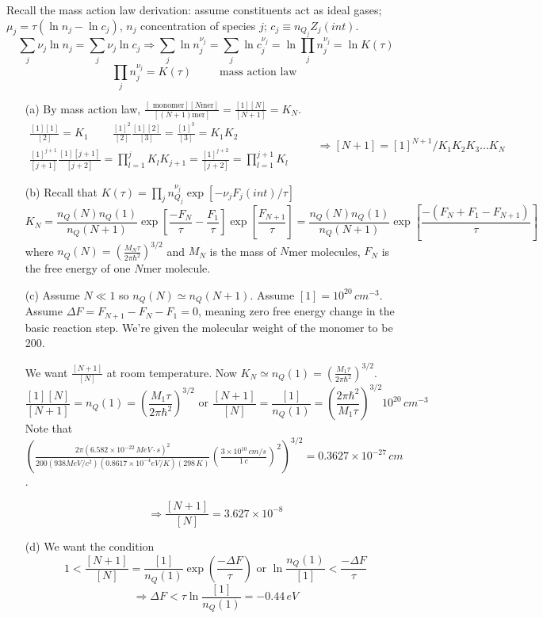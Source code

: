 \documentclass[twoside]{amsart}
\theoremstyle{plain}
\theoremstyle{definition}
\begin{document}
Recall the mass action law derivation: assume constituents act as ideal gases; $\mu_j  = \tau(\ln{n_j} - \ln{c_j})$, $n_j$ concentration of species $j$; $c_j \equiv n_{Q_j} Z_j(int)$.  
\[
\sum_j \nu_j\ln{n_j} = \sum_j \nu_j \ln{c_j} \Longrightarrow \sum_j \ln{n_j^{\nu_j}} = \sum_j \ln{c_j^{\nu_j}} = \ln{ \prod_j n_j^{\nu_j} } = \ln{ K(\tau) }
\]
\[
\prod_j n_j^{\nu_j} = K(\tau) \quad \quad \, \text{ mass action law }
\]
\hrulefill

\begin{itemize}
\item[(a)] By mass action law, $\frac{ [\text{ monomer}][N\text{mer}] }{[(N+1)\text{mer}]} = \frac{ [1][N]}{[N+1]} = K_N$.  
\[
\begin{gathered}
  \frac{[1][1]}{[2]} = K_1 \quad \quad \, \frac{ [1]^2}{[2]}\frac{[1][2]}{[3]} = \frac{[1]^3}{[3]} = K_1 K_2 \\ 
  \frac{ [1]^{j+1} }{[j+1]} \frac{ [1][j+1] }{[j+2]} = \prod^j_{l=1} K_l K_{j+1} = \frac{[1]^{j+2}}{[j+2]} = \prod_{l=1}^{j+1} K_l 
\end{gathered} \quad \quad \, \Longrightarrow \boxed{ [N+1]= [1]^{N+1}/K_1 K_2 K_3 \dots K_N }
\]
\item[(b)] Recall that $K(\tau) = \prod_j n_{Q_j}^{\nu_j} \exp{ [ - \nu_j F_j(int)/\tau ]}$  
\[
K_N = \frac{n_Q(N)n_Q(1)}{ n_Q(N+1)} \exp{ \left[ \frac{-F_N}{\tau} - \frac{F_1}{\tau} \right] }\exp{ \left[ \frac{ F_{N+1}}{\tau} \right] } = \frac{ n_Q(N)n_Q(1) }{n_Q(N+1)} \exp{ \left[ \frac{ - (F_N + F_1 - F_{N+1} )}{\tau} \right]}
\]
where $n_Q(N) = \left( \frac{M_N \tau}{2\pi \hbar^2} \right)^{3/2}$ and $M_N$ is the mass of $N$mer molecules, $F_N$ is the free energy of one $N$mer molecule.  
\item[(c)] Assume $N \ll 1$ so $n_Q(N) \simeq n_Q(N+1)$.  Assume $[1] = 10^{20} \, cm^{-3}$.  Assume $\Delta F = F_{N+1} - F_N - F_1 = 0$, meaning zero free energy change in the basic reaction step.  We're given the molecular weight of the monomer to be 200.  

We want $\frac{[N+1]}{[N]}$ at room temperature.  Now $K_N \simeq n_Q(1) = \left( \frac{ M_1 \tau}{2\pi \hbar^2} \right)^{3/2}$.  
\[
\frac{[1][N]}{[N+1]} = n_Q(1) = \left( \frac{M_1 \tau}{2\pi \hbar^2} \right)^{3/2} \text{ or } \frac{ [N+1]}{[N]} = \frac{[1]}{n_Q(1)} = \left( \frac{2\pi \hbar^2}{M_1 \tau} \right)^{3/2} 10^{20} \, cm^{-3}
\]
Note that $\left( \frac{ 2\pi (6.582 \times 10^{-22} \, MeV \cdot s)^2 }{ 200 (938 MeV/c^2)(0.8617 \times 10^{-4} eV/K)(298 \, K) } \left( \frac{ 3\times 10^{10} \, cm/s}{1 \, c} \right)^2 \right)^{3/2} = 0.3627 \times 10^{-27} \, cm$.  

\[
\Longrightarrow \boxed{ \frac{ [N+1]}{[N]} = 3.627 \times 10^{-8} }
\]
\item[(d)] We want the condition
\[
1 < \frac{ [N+1]}{[N]} = \frac{[1]}{n_Q(1)} \exp{ \left( \frac{ -\Delta F}{\tau} \right) } \text{ or } \ln{ \frac{n_Q(1)}{[1]}} < \frac{ - \Delta F}{\tau} 
\]
\[
\Longrightarrow \Delta F < \tau \ln{  \frac{ [1]}{ n_Q(1)} } = \boxed{ - 0.44 \, eV}
\]
\end{itemize}
\end{document}
